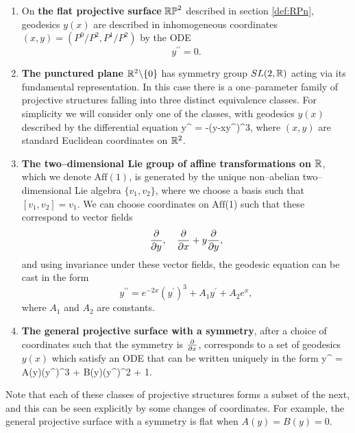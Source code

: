 \begin{enumerate}
\item On {\bf the flat projective surface} $\mathbb{RP}^2$ described in section \ref{def:RPn}, geodesics $y(x)$ are described in inhomogeneous coordinates $(x,y)=({P^0}/{P^2},{P^1}/{P^2})$ by the ODE
\[
y^{\prime\prime}=0.
\]
\item {\bf The punctured plane $\mathbb{R}^2\backslash\{0\}$} has symmetry group $SL(2,\mathbb{R})$ acting via its fundamental representation. In this case there is a one--parameter family of projective structures falling into three distinct equivalence classes. For simplicity we will consider only one of the classes, with geodesics $y(x)$ described by the differential equation
\be \label{eq:submaxODE}
y^{\prime\prime} = -(y-xy^\prime)^3,
\ee
where $(x,y)$ are standard Euclidean coordinates on $\mathbb{R}^2$.
\item {\bf The two--dimensional Lie group of affine transformations on $\mathbb{R}$}, which we denote $\mathrm{Aff}(1)$, is generated by the unique non--abelian two--dimensional Lie algebra $\{v_1,v_2\}$, where we choose a basis such that $[v_1,v_2]=v_1$. We can choose coordinates on $\mathrm{Aff}$(1) such that these correspond to vector fields
\[
\frac{\partial}{\partial y},\quad \frac{\partial}{\partial x} + y\frac{\partial}{\partial y},
\]
and using invariance under these vector fields, the geodesic equation can be cast in the form \cite{FLL}
\[
y^{\prime\prime} = e^{-2x}(y^\prime)^3 + A_1y^\prime + A_2e^x,
\]
where $A_1$ and $A_2$ are constants.
\item {\bf The general projective surface with a symmetry}, after a choice of coordinates such that the symmetry is $\frac{\partial}{\partial x}$, corresponds to a set of geodesics $y(x)$ which satisfy an ODE that can be written uniquely in the form \cite{FLL}
\be \label{eq:1symode}
y^{\prime\prime} = A(y)(y^\prime)^3 + B(y)(y^\prime)^2 + 1.
\ee
\end{enumerate}

Note that each of these classes of projective structures forms a subset of the next, and this can be seen explicitly by some changes of coordinates. For example, the general projective surface with a symmetry is flat when $A(y)=B(y)=0$.

